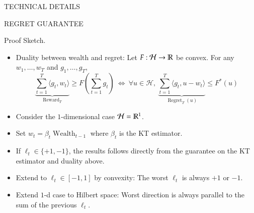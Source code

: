 \documentclass[final,t,serif,mathserif]{beamer}
\DeclareMathOperator{\Wealth}{Wealth}
\renewcommand{\H}{\mathcal{H}}  %
\DeclareMathOperator{\Regret}{Regret}
\DeclareMathOperator{\Reward}{Reward}
\def\blockspacec{\vspace{0.25cm}}
\begin{document}
\begin{frame}{}
\begin{columns}[t]
\begin{column}{.33\linewidth}
\begin{block}{TECHNICAL DETAILS}
\begin{minipage}{.98\linewidth}
\begin{block}{REGRET GUARANTEE}
    \vspace{1cm}

    \alert{Proof Sketch.}
    \begin{itemize}
    \item Duality between wealth and regret: Let $F:\H \to \R$ be convex. For any $w_1, \dots, w_T$ and $g_1, \dots, g_T$,
    \[
      \underbrace{\sum_{t=1}^T \langle g_t, w_t \rangle}_{\Reward_T} \ge F\left( \sum_{t=1}^T g_t \right)
      \ \Leftrightarrow \
      \forall u \in \H, \
      \underbrace{\sum_{t=1}^T \langle g_t, u - w_t\rangle}_{\Regret_T(u)} \le F^*(u)
    \]
    \item Consider the $1$-dimensional case $\H=\R^1$.
    \item Set $w_t=\beta_t \Wealth_{t-1}$ where $\beta_t$ is the KT estimator.
    \item If $\ell_t \in \{+1, -1\}$, the results follows directly from the guarantee on the KT estimator and duality above.
    \item Extend to $\ell_t \in [-1,1]$ by convexity: The worst $\ell_t$ is always $+1$ or $-1$.
    \item Extend $1$-d case to Hilbert space: Worst direction is always parallel to the sum of the previous $\ell_t$.
    \end{itemize}
    \end{block}
    \end{minipage}
    \blockspacec
    \end{block}
\end{column}


\end{columns}
\end{frame}
\end{document}
